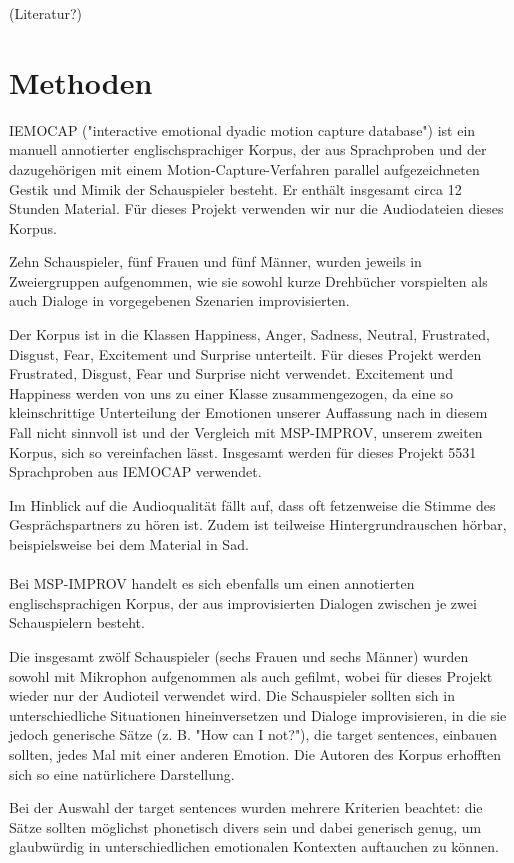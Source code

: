 \documentclass{article} %
\begin{document}
(Literatur?)

\section{Methoden}

IEMOCAP ("interactive emotional dyadic motion capture
database") ist ein manuell annotierter englischsprachiger Korpus, der aus Sprachproben und der dazugehörigen mit einem Motion-Capture-Verfahren parallel aufgezeichneten Gestik und Mimik der Schauspieler besteht. Er enthält insgesamt circa 12 Stunden Material. Für dieses Projekt verwenden wir nur die Audiodateien dieses Korpus. 

Zehn Schauspieler, fünf Frauen und fünf Männer, wurden jeweils in Zweiergruppen aufgenommen, wie sie sowohl kurze Drehbücher vorspielten als auch Dialoge in vorgegebenen Szenarien improvisierten. 

Der Korpus ist in die Klassen Happiness, Anger, Sadness, Neutral, Frustrated, Disgust, Fear, Excitement und Surprise unterteilt. Für dieses Projekt werden Frustrated, Disgust, Fear und Surprise nicht verwendet. Excitement und Happiness werden von uns zu einer Klasse zusammengezogen, da eine so kleinschrittige Unterteilung der Emotionen unserer Auffassung nach in diesem Fall nicht sinnvoll ist und der Vergleich mit MSP-IMPROV, unserem zweiten Korpus, sich so vereinfachen lässt. Insgesamt werden für dieses Projekt 5531 Sprachproben aus IEMOCAP verwendet. 

Im Hinblick auf die Audioqualität fällt auf, dass oft fetzenweise die Stimme des Gesprächspartners zu hören ist. Zudem ist teilweise Hintergrundrauschen hörbar, beispielsweise bei dem Material in Sad. \\ \\
Bei MSP-IMPROV handelt es sich ebenfalls um einen annotierten englischsprachigen Korpus, der aus improvisierten Dialogen zwischen je zwei Schauspielern besteht. 

Die insgesamt zwölf Schauspieler (sechs Frauen und sechs Männer) wurden sowohl mit Mikrophon aufgenommen als auch gefilmt, wobei für dieses Projekt wieder nur der Audioteil verwendet wird. Die Schauspieler sollten sich in unterschiedliche Situationen hineinversetzen und Dialoge improvisieren, in die sie jedoch generische Sätze (z. B. "How can I not?"), die target sentences, einbauen sollten, jedes Mal mit einer anderen Emotion. Die Autoren des Korpus erhofften sich so eine natürlichere Darstellung. 

Bei der Auswahl der target sentences wurden mehrere Kriterien beachtet: die Sätze sollten möglichst phonetisch divers sein und dabei generisch genug, um glaubwürdig in unterschiedlichen emotionalen Kontexten auftauchen zu können. 
\end{document}
